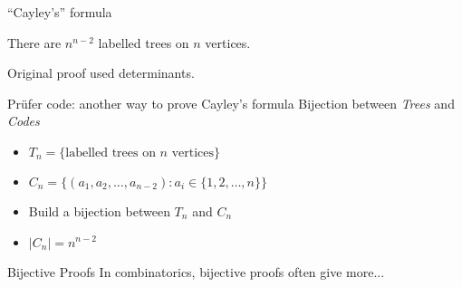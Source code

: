 \documentclass{beamer}
\begin{document}
\begin{frame}{``Cayley's'' formula}
  \begin{theorem}
    There are $n^{n-2}$ labelled trees on $n$ vertices.
  \end{theorem}
Original proof used determinants.
  \begin{block}{Pr\"ufer code: another way to prove Cayley's formula}
Bijection between \emph{Trees} and \emph{Codes}
\begin{itemize}
\item $T_n=\{ \text{labelled trees on $n$ vertices}\}$ 
\item $C_n=\{(a_1,a_2,\dots, a_{n-2}) : a_i\in \{1,2,\dots, n\} \} $
\item Build a bijection between $T_n$ and $C_n$
\item $|C_n|=n^{n-2}$
  \end{itemize}
        \end{block}

  
  \begin{block}{Bijective Proofs}
    In combinatorics, bijective proofs often give more... 
\end{block}
  
\end{frame}
\end{document}
